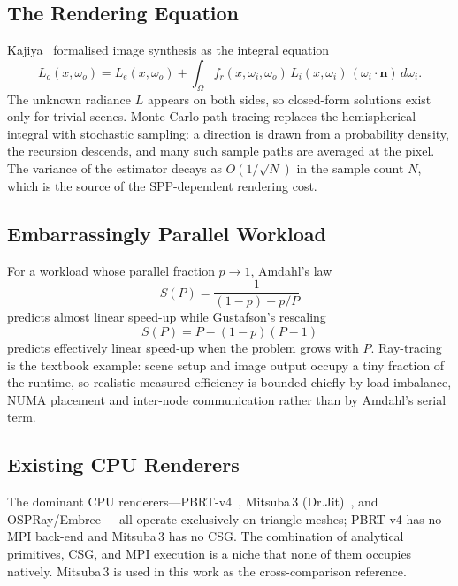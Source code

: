 \documentclass[twocolumn,10pt,cleanhead,cleanfoot]{asme2e}
\begin{document}
\subsection*{The Rendering Equation}
Kajiya~\cite{kajiya1986} formalised image synthesis as the integral equation
\begin{equation}
L_o(x,\omega_o) = L_e(x,\omega_o) + \!\!\int_{\Omega}\! f_r(x,\omega_i,\omega_o)\,L_i(x,\omega_i)\,(\omega_i\!\cdot\!\mathbf{n})\,d\omega_i.
\label{eq:rendering}
\end{equation}
The unknown radiance $L$ appears on both sides, so closed-form solutions exist only for trivial scenes. Monte-Carlo path tracing replaces the hemispherical integral with stochastic sampling: a direction is drawn from a probability density, the recursion descends, and many such sample paths are averaged at the pixel. The variance of the estimator decays as $O(1/\sqrt{N})$ in the sample count $N$, which is the source of the SPP-dependent rendering cost.

\subsection*{Embarrassingly Parallel Workload}
For a workload whose parallel fraction $p \to 1$, Amdahl's law~\cite{amdahl1967}
\begin{equation}
S(P)=\frac{1}{(1-p)+p/P}
\label{eq:amdahl}
\end{equation}
predicts almost linear speed-up while Gustafson's rescaling~\cite{gustafson1988}
\begin{equation}
S(P)=P-(1-p)(P-1)
\label{eq:gustafson}
\end{equation}
predicts effectively linear speed-up when the problem grows with $P$. Ray-tracing is the textbook example: scene setup and image output occupy a tiny fraction of the runtime, so realistic measured efficiency is bounded chiefly by load imbalance, NUMA placement and inter-node communication rather than by Amdahl's serial term.

\subsection*{Existing CPU Renderers}
The dominant CPU renderers---PBRT-v4~\cite{pbrt4}, Mitsuba\,3 (Dr.Jit)~\cite{drjit}, and OSPRay/Embree~\cite{ospray}---all operate exclusively on triangle meshes; PBRT-v4 has no MPI back-end and Mitsuba\,3 has no CSG. The combination of analytical primitives, CSG, and MPI execution is a niche that none of them occupies natively. Mitsuba\,3 is used in this work as the cross-comparison reference.
\end{document}
